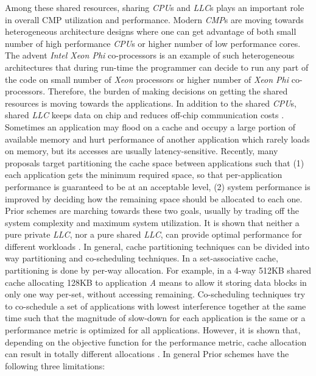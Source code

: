 \indent Among these shared resources, sharing \textit{CPU}s and \textit{LLC}s plays an important role in overall CMP utilization and performance. Modern \textit{CMP}s are moving towards heterogeneous architecture designs where one can get advantage of both small number of high performance \textit{CPU}s or higher number of low performance cores. The advent \textit{Intel Xeon Phi} co-processors is an example of such heterogeneous architectures that during run-time the programmer can decide to run any part of the code on small number of \textit{Xeon} processors or higher number of \textit{Xeon Phi} co-processors. Therefore, the burden of making decisions on getting the shared resources is moving towards the applications. In addition to the shared \textit{CPU}s, shared \textit{LLC} keeps data on chip and reduces off-chip communication costs \cite{liu2004organizing}. Sometimes an application may flood on a cache and occupy a large portion of available memory and hurt performance of another application which rarely loads on memory, but its accesses are usually latency-sensitive. Recently, many proposals target partitioning the cache space between applications such that (1) each application gets the minimum required space, so that per-application performance is guaranteed to be at an acceptable level, (2) system performance is improved by deciding how the remaining space should be allocated to each one. \\
\indent Prior schemes \cite{zhuravlev2010addressing, qureshi2006utility, lin2008gaining, iyer2004cqos, liu2004organizing, rafique2006architectural, jiang2008analysis} are marching towards these two goals, usually by trading off the system complexity and maximum system utilization. It is shown that neither a pure private \textit{LLC}, nor a pure shared \textit{LLC}, can provide optimal performance for different workloads \cite{cho2006managing}. In general, cache partitioning techniques can be divided into way partitioning and co-scheduling techniques. In a set-associative cache, partitioning is done by per-way allocation. For example, in a 4-way 512KB shared cache allocating 128KB to application \textit{A} means to allow it storing data blocks in only one way per-set, without accessing remaining. Co-scheduling techniques try to co-schedule a set of applications with lowest interference together at the same time such that the magnitude of slow-down for each application is the same or a performance metric is optimized for all applications. However, it is shown that, depending on the objective function for the performance metric, cache allocation can result in totally different allocations \cite{hsu2006communist}. In general Prior schemes have the following three limitations:\\
